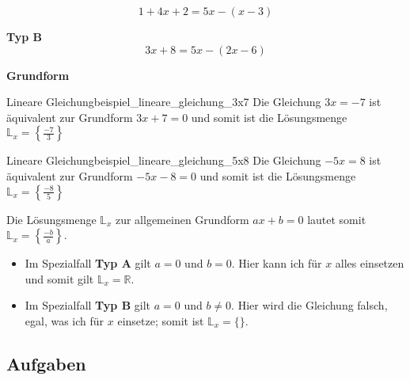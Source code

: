 $$1+4x+2 = 5x - (x-3)$$

\textbf{Typ B}\\

$$3x+8 = 5x-(2x-6)$$

\textbf{Grundform}\\

\begin{beispiel}{Lineare Gleichung}{beispiel_lineare_gleichung_3x7}
  Die Gleichung $3x=-7$ ist äquivalent zur Grundform $3x+7=0$ und somit ist die Lösungsmenge $\mathbb{L}_x=\left\{ \frac{-7}{3}  \right\}$
  \end{beispiel}

\begin{beispiel}{Lineare Gleichung}{beispiel_lineare_gleichung_5x8}
  Die Gleichung $-5x=8$ ist äquivalent zur Grundform $-5x-8=0$ und somit ist die Lösungsmenge $\mathbb{L}_x=\left\{ \frac{-8}{5}  \right\}$
\end{beispiel}

Die Lösungsmenge $\mathbb{L}_x$ zur allgemeinen Grundform $ax+b=0$ lautet somit $\mathbb{L}_x=\left\{ \frac{-b}{a} \right\}$.

\begin{itemize}
  \item Im Spezialfall \textbf{Typ A} gilt $a=0$ und $b=0$. Hier kann ich für $x$ alles einsetzen und somit gilt $\mathbb{L}_x=\mathbb{R}$.
  \item Im Spezialfall \textbf{Typ B} gilt $a=0$ und $b\ne 0$. Hier wird die Gleichung falsch, egal, was ich für $x$ einsetze; somit ist $\mathbb{L}_x=\{\}$.
\end{itemize}
\newpage

\subsection*{Aufgaben}
\newpage

